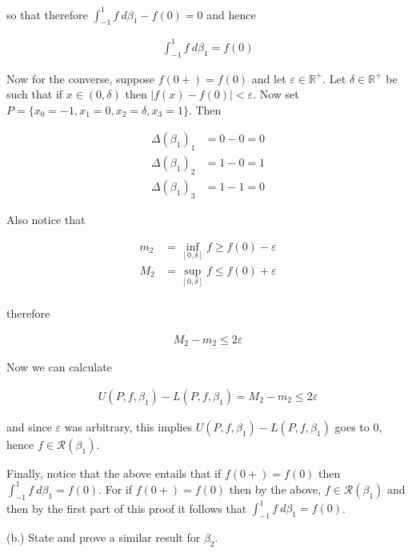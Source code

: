 \documentclass{article}
\begin{document}
  so that therefore $\int_{-1}^1 f \ d\beta_1-f(0)=0$ and hence

  \begin{align*}
    \int_{-1}^1 f \ d\beta_1=f(0)
  \end{align*}

  \vspace{1cm}

  Now for the converse, suppose $f(0+)=f(0)$ and let $\varepsilon\in\mathbb R^+$.  Let $\delta\in\mathbb R^+$ be such that if $x\in(0,\delta)$ then $|f(x)-f(0)|<\varepsilon$.  Now set $P=\{x_0=-1,x_1=0,x_2=\delta,x_3=1\}$.  Then

  \begin{align*}
    \Delta(\beta_1)_1 &= 0-0=0 \\
    \Delta(\beta_1)_2 &= 1-0=1 \\
    \Delta(\beta_1)_3 &= 1-1=0
  \end{align*}

  Also notice that

  \begin{align*}
    m_2&=\displaystyle\inf_{[0,\delta]}f\geq f(0)-\varepsilon\\
    M_2&=\displaystyle\sup_{[0,\delta]}f\leq f(0)+\varepsilon\\
  \end{align*}

  therefore

  \begin{align*}
    M_2-m_2 \leq 2\varepsilon
  \end{align*}

  Now we can calculate

  \begin{align*}
    U(P,f,\beta_1)-L(P,f,\beta_1) = M_2-m_2\leq 2\varepsilon
  \end{align*}

  and since $\varepsilon$ was arbitrary, this implies $U(P,f,\beta_1)-L(P,f,\beta_1)$ goes to 0, hence $f\in\mathscr R(\beta_1)$.

  \vspace{1cm}

  Finally, notice that the above entails that if $f(0+)=f(0)$ then $\int_{-1}^1 f\ d\beta_1 = f(0)$.  For if $f(0+)=f(0)$ then by the above, $f\in\mathscr R(\beta_1)$ and then by the first part of this proof it follows that $\int_{-1}^1 f\ d\beta_1=f(0)$.

  \vspace{1cm}

  {\Large \color{Sepia} (b.) State and prove a similar result for $\beta_2$.}
\end{document}
